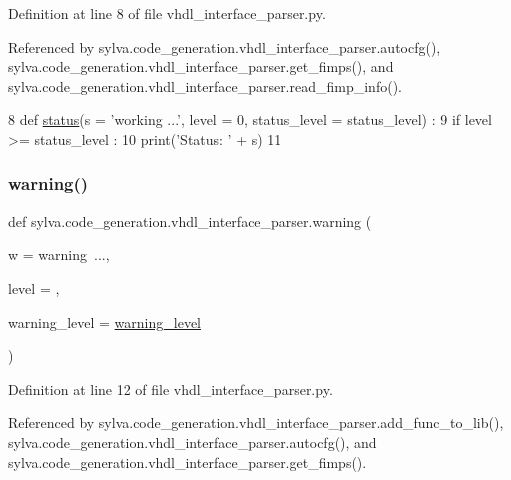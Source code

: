 Definition at line 8 of file vhdl\+\_\+interface\+\_\+parser.\+py.



Referenced by sylva.\+code\+\_\+generation.\+vhdl\+\_\+interface\+\_\+parser.\+autocfg(), sylva.\+code\+\_\+generation.\+vhdl\+\_\+interface\+\_\+parser.\+get\+\_\+fimps(), and sylva.\+code\+\_\+generation.\+vhdl\+\_\+interface\+\_\+parser.\+read\+\_\+fimp\+\_\+info().


\begin{DoxyCode}
8 \textcolor{keyword}{def }\hyperlink{namespacesylva_1_1code__generation_1_1vhdl__interface__parser_a531a0f0634e3fde1c48dc06c7c8c019f}{status}(s = 'working ...', level = 0, status\_level = status\_level) :
9   \textcolor{keywordflow}{if} level >= status\_level :
10     print(\textcolor{stringliteral}{'Status: '} + s)
11 
\end{DoxyCode}
\mbox{\label{namespacesylva_1_1code__generation_1_1vhdl__interface__parser_a63f8ceba954ddb8e1d7713fead5ffc9c}} 
\subsubsection{\texorpdfstring{warning()}{warning()}}
{\footnotesize\ttfamily def sylva.\+code\+\_\+generation.\+vhdl\+\_\+interface\+\_\+parser.\+warning (\begin{DoxyParamCaption}\item[{}]{w = {\ttfamily \textquotesingle{}warning~...\textquotesingle{}},  }\item[{}]{level = {},  }\item[{}]{warning\+\_\+level = {\ttfamily \hyperlink{namespacesylva_1_1code__generation_1_1vhdl__interface__parser_aa82bc16742c29c741d43cf3819798d86}{warning\+\_\+level}} }\end{DoxyParamCaption})}



Definition at line 12 of file vhdl\+\_\+interface\+\_\+parser.\+py.



Referenced by sylva.\+code\+\_\+generation.\+vhdl\+\_\+interface\+\_\+parser.\+add\+\_\+func\+\_\+to\+\_\+lib(), sylva.\+code\+\_\+generation.\+vhdl\+\_\+interface\+\_\+parser.\+autocfg(), and sylva.\+code\+\_\+generation.\+vhdl\+\_\+interface\+\_\+parser.\+get\+\_\+fimps().


